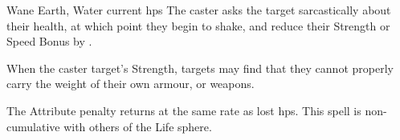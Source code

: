   {}%
  {Wane}%
  {Earth, Water}%
  {current \glspl{hp}}%
  {The caster asks the target sarcastically about their health, at which point they begin to shake, and reduce their Strength or Speed Bonus by .}%
  {When the caster target's Strength, targets may find that they cannot properly carry the weight of their own armour, or weapons.

    The Attribute penalty returns at the same rate as lost \glspl{hp}.
    This spell is non-cumulative with others of the Life sphere.}
